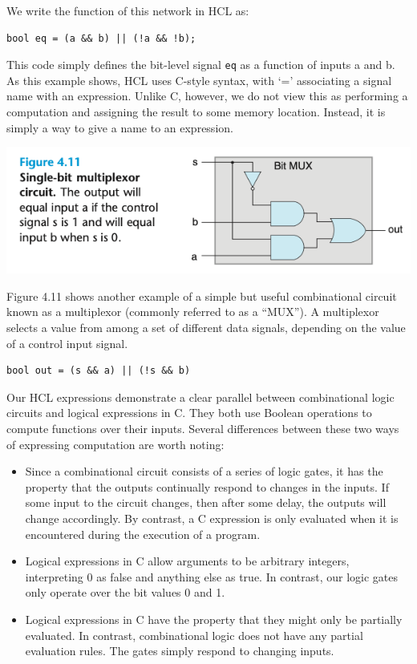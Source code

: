 \documentclass[11pt]{article}
\begin{document}
We write the function of this network in HCL as:\\
\begin{verbatim}
bool eq = (a && b) || (!a && !b);
\end{verbatim}


This code simply defines the bit-level signal \texttt{eq} as a function of inputs a and b. As this example shows, HCL uses C-style syntax, with ‘=’ associating a signal name with an expression. Unlike C, however, we do not view this as performing a computation and assigning the result to some memory location. Instead, it is simply a way to give a name to an expression.\\

\begin{center}
\includegraphics[width=.9\linewidth]{pics/figure4.11-single-bit-multiplexor-circuit.png}
\end{center}

Figure 4.11 shows another example of a simple but useful combinational circuit known as a multiplexor (commonly referred to as a “MUX”). A multiplexor selects a value from among a set of different data signals, depending on the value of a control input signal.\\
\begin{verbatim}
bool out = (s && a) || (!s && b)
\end{verbatim}


Our HCL expressions demonstrate a clear parallel between combinational logic circuits and logical expressions in C. They both use Boolean operations to compute functions over their inputs. Several differences between these two ways of expressing computation are worth noting:\\
\begin{itemize}
\item Since a combinational circuit consists of a series of logic gates, it has the property that the outputs continually respond to changes in the inputs. If some input to the circuit changes, then after some delay, the outputs will change accordingly. By contrast, a C expression is only evaluated when it is encountered during the execution of a program.\\
\item Logical expressions in C allow arguments to be arbitrary integers, interpreting 0 as false and anything else as true. In contrast, our logic gates only operate over the bit values 0 and 1.\\
\item Logical expressions in C have the property that they might only be partially evaluated. In contrast, combinational logic does not have any partial evaluation rules. The gates simply respond to changing inputs.\\
\end{itemize}
\end{document}
